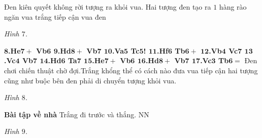 \begin{multicols}{2}
	\vskip 0.1cm 
	Đen kiên quyết không rời tượng ra khỏi vua. Hai tượng đen tạo ra $1$ hàng rào ngăn vua trắng tiếp cận vua đen 
	\begin{center}
		\newgame
		\scalebox{0.95}\showboard
		\vskip 0.1cm
		\textit{\small\color{gocco}Hình $7$.}
	\end{center}
	$\pmb{8}$\textbf{\color{gocco}.He$\pmb{7+}$ Vb$\pmb{6}$ $\pmb{9}$.Hd$\pmb{8+}$ Vb$\pmb{7}$ $\pmb{10}$.Va$\pmb{5}$ Tc$\pmb{5}$! $\pmb{11}$.Hf$\pmb{6}$ Tb$\pmb{6+}$ $\pmb{12}$.Vb$\pmb{4}$ Vc$\pmb{7}$
	\vskip 0.1cm 
	$\pmb{13}$.Vc$\pmb{4}$ Vb$\pmb{7}$ $\pmb{14}$.Hd$\pmb{6}$ Ta$\pmb{7}$ $\pmb{15}$.He$\pmb{7+}$ Vb$\pmb{6}$ $\pmb{16}$.Hd$\pmb{8+}$ Vb$\pmb{7}$ $\pmb{17}$.Vc$\pmb{3}$ Tb}$\pmb{6=}$ 
	\vskip 0.1cm
	Đen chơi chiến thuật chờ đợi.Trắng khổng thể có cách nào đưa vua tiếp cận hai tượng cũng như buộc bên đen phải di chuyển tượng khỏi vua. 
	\begin{center}
		\newgame
		\scalebox{0.95}\showboard
		\vskip 0.1cm
		\textit{\small\color{gocco}Hình $8$.}
	\end{center}
	\textbf{\color{gocco}Bài tập về nhà}
	\vskip 0.1cm
	Trắng đi trước và thắng. NN
	\begin{center}
		\newgame
		\scalebox{0.95}\showboard
		\vskip 0.1cm
		\textit{\small\color{gocco}Hình $9$.}
	\end{center}
\end{multicols}




